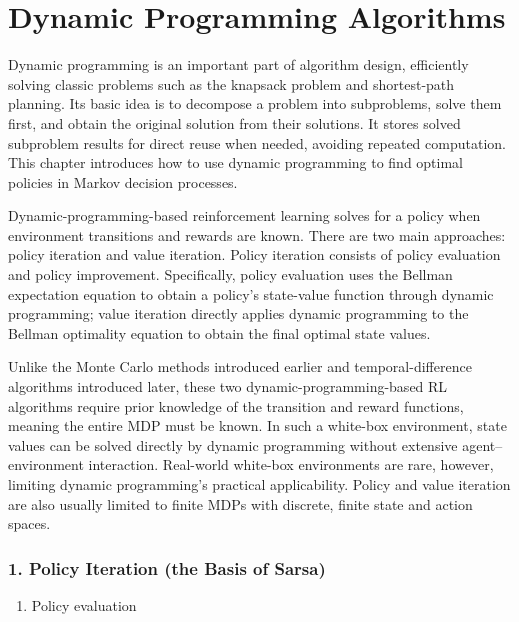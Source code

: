 \setcounter{section}{1}

\hypertarget{dynamic-programming-algorithms}{%
\section{Dynamic Programming Algorithms}\label{dynamic-programming-algorithms}}

Dynamic programming is an important part of algorithm design, efficiently solving classic problems such as the knapsack problem and shortest-path planning. Its basic idea is to decompose a problem into subproblems, solve them first, and obtain the original solution from their solutions. It stores solved subproblem results for direct reuse when needed, avoiding repeated computation. This chapter introduces how to use dynamic programming to find optimal policies in Markov decision processes.

Dynamic-programming-based reinforcement learning solves for a policy when environment transitions and rewards are known. There are two main approaches: policy iteration and value iteration. Policy iteration consists of policy evaluation and policy improvement. Specifically, policy evaluation uses the Bellman expectation equation to obtain a policy's state-value function through dynamic programming; value iteration directly applies dynamic programming to the Bellman optimality equation to obtain the final optimal state values.

Unlike the Monte Carlo methods introduced earlier and temporal-difference algorithms introduced later, these two dynamic-programming-based RL algorithms require prior knowledge of the transition and reward functions, meaning the entire MDP must be known. In such a white-box environment, state values can be solved directly by dynamic programming without extensive agent--environment interaction. Real-world white-box environments are rare, however, limiting dynamic programming's practical applicability. Policy and value iteration are also usually limited to finite MDPs with discrete, finite state and action spaces.

\hypertarget{policy-iteration-the-basis-of-sarsa}{%
\subsubsection{1. Policy Iteration (the Basis of Sarsa)}\label{policy-iteration-the-basis-of-sarsa}}

\begin{enumerate}
\def\labelenumi{(\arabic{enumi})}
\tightlist
\item
  Policy evaluation
\end{enumerate}

